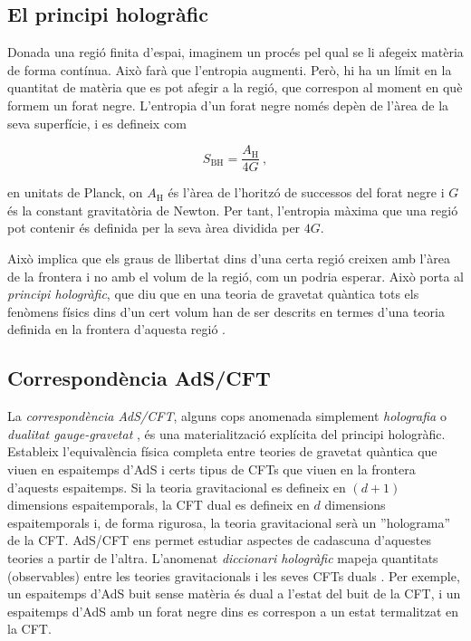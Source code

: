 \documentclass[twocolumn]{revtex4}
\providecommand{\eq}[2]{
    \begin{equation}
        #2
    \label{eq:#1}
    \end{equation}
}
\begin{document}
\subsection{El principi hologràfic} \label{ss:Holography}

Donada una regió finita d'espai, imaginem un procés pel qual se li afegeix matèria de forma contínua. Això farà que l'entropia augmenti. Però, hi ha un límit en la quantitat de matèria que es pot afegir a la regió, que correspon al moment en què formem un forat negre. L'entropia d'un forat negre només depèn de l'àrea de la seva superfície, i es defineix com \cite{bekenstein_black_1973}
\eq{BH}{
    S_\text{BH} = \frac{ A_\text{H} }{ 4 G } \ ,
}
en unitats de Planck, on $A_\text{H}$ és l'àrea de l'horitzó de successos del forat negre i $G$ és la constant gravitatòria de Newton. Per tant, l'entropia màxima que una regió pot contenir és definida per la seva àrea dividida per $4G$.

Això implica que els graus de llibertat dins d'una certa regió creixen amb l'àrea de la frontera i no amb el volum de la regió, com un podria esperar. Això porta al \emph{principi hologràfic}, que diu que en una teoria de gravetat quàntica tots els fenòmens físics dins d'un cert volum han de ser descrits en termes d'una teoria definida en la frontera d'aquesta regió \cite{t_hooft_dimensional_2009}.


\subsection{Correspondència AdS/CFT} \label{ss:AdS/CFT}

La \emph{correspondència AdS/CFT}, alguns cops anomenada simplement \emph{holografia} o \emph{dualitat gauge-gravetat} \cite{maldacena_large_1999}, és una materialització explícita del principi hologràfic. Estableix l'equivalència física completa entre teories de gravetat quàntica que viuen en espaitemps d'AdS i certs tipus de CFTs que viuen en la frontera d'aquests espaitemps. Si la teoria gravitacional es defineix en $(d+1)$ dimensions espaitemporals, la CFT dual es defineix en $d$ dimensions espaitemporals i, de forma rigurosa, la teoria gravitacional serà un ''holograma'' de la CFT. AdS/CFT ens permet estudiar aspectes de cadascuna d'aquestes teories a partir de l'altra. L'anomenat \emph{diccionari hologràfic} mapeja quantitats (observables) entre les teories gravitacionals i les seves CFTs duals \cite{witten_anti_1998}. Per exemple, un espaitemps d'AdS buit sense matèria és dual a l'estat del buit de la CFT, i un espaitemps d'AdS amb un forat negre dins es correspon a un estat termalitzat en la CFT.
\end{document}
